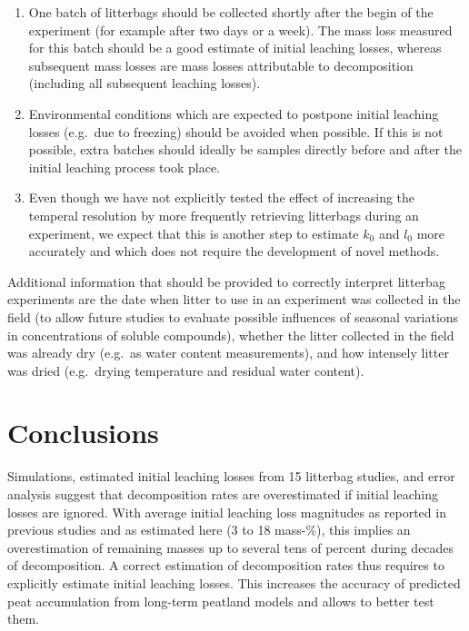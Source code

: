 \documentclass[
  12pt,
]{article}
\begin{document}
\begin{enumerate}
\def\labelenumi{\arabic{enumi}.}
\item
  One batch of litterbags should be collected shortly after the begin of the experiment (for example after two days or a week). The mass loss measured for this batch should be a good estimate of initial leaching losses, whereas subsequent mass losses are mass losses attributable to decomposition (including all subsequent leaching losses).
\item
  Environmental conditions which are expected to postpone initial leaching losses (e.g.~due to freezing) should be avoided when possible. If this is not possible, extra batches should ideally be samples directly before and after the initial leaching process took place.
\item
  Even though we have not explicitly tested the effect of increasing the temperal resolution by more frequently retrieving litterbags during an experiment, we expect that this is another step to estimate \(k_0\) and \(l_0\) more accurately and which does not require the development of novel methods.
\end{enumerate}

Additional information that should be provided to correctly interpret litterbag experiments are the date when litter to use in an experiment was collected in the field (to allow future studies to evaluate possible influences of seasonal variations in concentrations of soluble compounds), whether the litter collected in the field was already dry (e.g.~as water content measurements), and how intensely litter was dried (e.g.~drying temperature and residual water content).

\hypertarget{conclusions}{%
\section{Conclusions}\label{conclusions}}

Simulations, estimated initial leaching losses from 15 litterbag studies, and error analysis suggest that decomposition rates are overestimated if initial leaching losses are ignored. With average initial leaching loss magnitudes as reported in previous studies and as estimated here (3 to 18 mass-\%), this implies an overestimation of remaining masses up to several tens of percent during decades of decomposition. A correct estimation of decomposition rates thus requires to explicitly estimate initial leaching losses. This increases the accuracy of predicted peat accumulation from long-term peatland models and allows to better test them.
\end{document}
